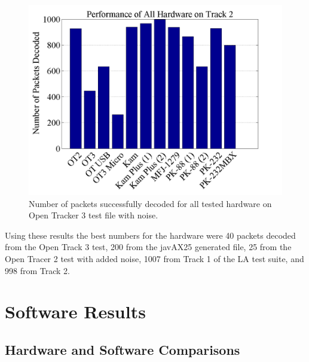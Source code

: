  \begin{figure}
  \centering
	\includegraphics[width=0.75\linewidth]{images/PerformanceofAllHardwareonTrack2.png} 
	\caption{Number of packets successfully decoded for all tested hardware on Open Tracker 3 test file with noise.}
   \label{allHardwareTrack2}
\end{figure}

Using these results the best numbers for the hardware were 40 packets decoded from the Open Track 3 test, 200 from the javAX25 generated file, 25 from the Open Tracer 2 test with added noise, 1007 from Track 1 of the LA test suite, and 998 from Track 2.

\section{Software Results}

\subsection{Hardware and Software Comparisons}

